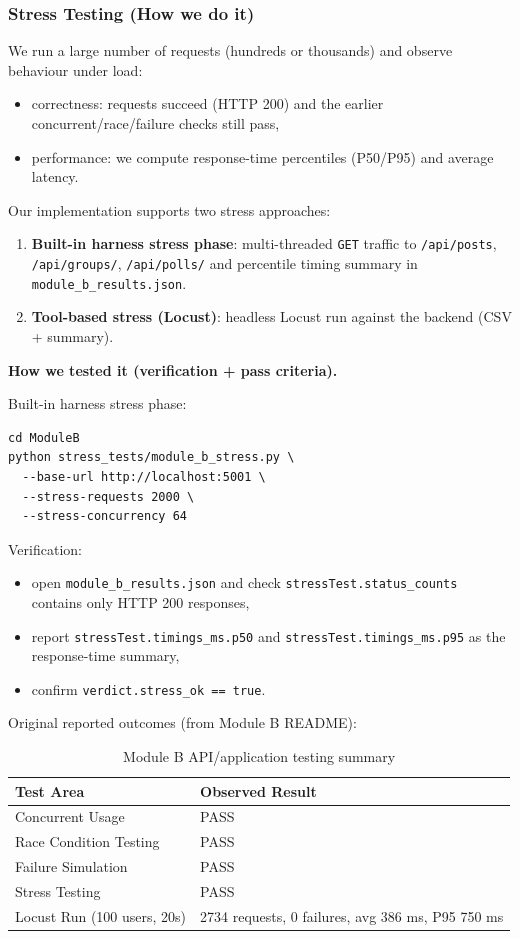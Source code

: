 \documentclass[12pt,a4paper]{article}
\begin{document}
\subsubsection{Stress Testing (How we do it)}
We run a large number of requests (hundreds or thousands) and observe behaviour under load:
\begin{itemize}[noitemsep]
  \item correctness: requests succeed (HTTP 200) and the earlier concurrent/race/failure checks still pass,
  \item performance: we compute response-time percentiles (P50/P95) and average latency.
\end{itemize}

Our implementation supports two stress approaches:
\begin{enumerate}[noitemsep]
  \item \textbf{Built-in harness stress phase}: multi-threaded \texttt{GET} traffic to \texttt{/api/posts}, \texttt{/api/groups/}, \texttt{/api/polls/} and percentile timing summary in \texttt{module\_b\_results.json}.
  \item \textbf{Tool-based stress (Locust)}: headless Locust run against the backend (CSV + summary).
\end{enumerate}

\textbf{How we tested it (verification + pass criteria).}

Built-in harness stress phase:
\begin{lstlisting}[basicstyle=\ttfamily\small, caption={Built-in stress test run command (Module B)}]
cd ModuleB
python stress_tests/module_b_stress.py \
  --base-url http://localhost:5001 \
  --stress-requests 2000 \
  --stress-concurrency 64
\end{lstlisting}

Verification:
\begin{itemize}[noitemsep]
  \item open \texttt{module\_b\_results.json} and check \texttt{stressTest.status\_counts} contains only HTTP 200 responses,
  \item report \texttt{stressTest.timings\_ms.p50} and \texttt{stressTest.timings\_ms.p95} as the response-time summary,
  \item confirm \texttt{verdict.stress\_ok == true}.
\end{itemize}

Original reported outcomes (from Module B README):
\begin{table}[H]
\centering
\begin{tabularx}{\textwidth}{lX}
\hline
\textbf{Test Area} & \textbf{Observed Result} \\
\hline
Concurrent Usage & PASS \\
Race Condition Testing & PASS \\
Failure Simulation & PASS \\
Stress Testing & PASS \\
Locust Run (100 users, 20s) & 2734 requests, 0 failures, avg 386 ms, P95 750 ms \\
\hline
\end{tabularx}
\caption{Module B API/application testing summary}
\end{table}
\end{document}
